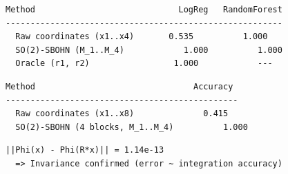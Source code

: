 \documentclass[11pt,a4paper]{report}
\begin{document}
\label{app:ch4-lst9}
\begin{lstlisting}[style=textstyle, caption={Classification results in~$\mathbb{R}^4$ (2~rotational blocks)}]
Method                             LogReg   RandomForest
--------------------------------------------------------
  Raw coordinates (x1..x4)       0.535          1.000
  SO(2)-SBOHN (M_1..M_4)            1.000          1.000
  Oracle (r1, r2)                 1.000            ---
\end{lstlisting}

\label{app:ch4-lst10}
\begin{lstlisting}[style=textstyle, caption={Classification results in~$\mathbb{R}^8$ (4~rotational blocks)}]
Method                                Accuracy
-----------------------------------------------
  Raw coordinates (x1..x8)              0.415
  SO(2)-SBOHN (4 blocks, M_1..M_4)          1.000
\end{lstlisting}

\label{app:ch4-lst11}
\begin{lstlisting}[style=textstyle, caption={Invariance: $\|\Phi(x)-\Phi(R_\theta\,x)\|$}]
  ||Phi(x) - Phi(R*x)|| = 1.14e-13
  => Invariance confirmed (error ~ integration accuracy)
\end{lstlisting}
\end{document}
